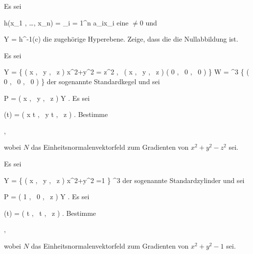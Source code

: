 \setcounter{section}{4}


{}
{

Es sei

\mavergleichskette
{\vergleichskette
{ h(x_1 , \ldots , x_n)
}
{ = }{ \sum_{i = 1}^n a_ix_i
}
{  }{
}
{    }{
}
{   }{
}
}
{}{}{}
eine
$\neq 0$ und

\mavergleichskette
{\vergleichskette
{ Y
}
{ = }{ h^{-1}(c)
}
{  }{
}
{    }{
}
{   }{
}
}
{}{}{}
die zugehörige Hyperebene. Zeige, dass die
die Nullabbildung ist.

}
{} {}

{}
{

Es sei

\mavergleichskettedisp
{\vergleichskette
{ Y
}
{ =} { \left\{  \left(  x   , \,   y  , \,  z                 \right)   \mid   x^2+y^2 = z^2 , \,  \left(  x   , \,   y  , \,  z                 \right)  \neq  \left(  0   , \,   0  , \,   0                 \right)       \right\}
}
{ \subseteq} { W
}
{ =} { \R^3 \setminus \{  \left(  0   , \,   0  , \,   0                 \right) \}
}
{ } {
}
}
{}{}{}
der sogenannte Standardkegel und sei

\mavergleichskette
{\vergleichskette
{ P
}
{ = }{ \left(  x   , \,   y  , \,  z                 \right)
}
{ \in }{ Y
}
{    }{
}
{   }{
}
}
{}{}{.}
Es sei

\mavergleichskettedisp
{\vergleichskette
{ \gamma(t)
}
{ =} { \left(  x  \cos  t    , \,   y  \sin  t  , \,  z                 \right)
}
{ } {
}
{ } {
}
{ } {
}
}
{}{}{.}
Bestimme

 { , }

wobei $N$ das Einheitsnormalenvektorfeld zum Gradienten von $x^2+y^2-z^2$ sei.

}
{} {}

{}
{

Es sei

\mavergleichskettedisp
{\vergleichskette
{ Y
}
{ =} { \left\{  \left(  x   , \,   y  , \,  z                 \right)   \mid   x^2+y^2 =1         \right\}
}
{ \subseteq} { \R^3
}
{ } {
}
{ } {
}
}
{}{}{}
der sogenannte Standardzylinder und sei

\mavergleichskette
{\vergleichskette
{ P
}
{ = }{ \left(  1   , \,   0  , \,  z                 \right)
}
{ \in }{ Y
}
{    }{
}
{   }{
}
}
{}{}{.}
Es sei

\mavergleichskettedisp
{\vergleichskette
{ \gamma(t)
}
{ =} { \left(  \cos  t   , \,   \sin  t  , \,  z                 \right)
}
{ } {
}
{ } {
}
{ } {
}
}
{}{}{.}
Bestimme

 { , }

wobei $N$ das Einheitsnormalenvektorfeld zum Gradienten von $x^2+y^2-1$ sei.

}
{} {}

